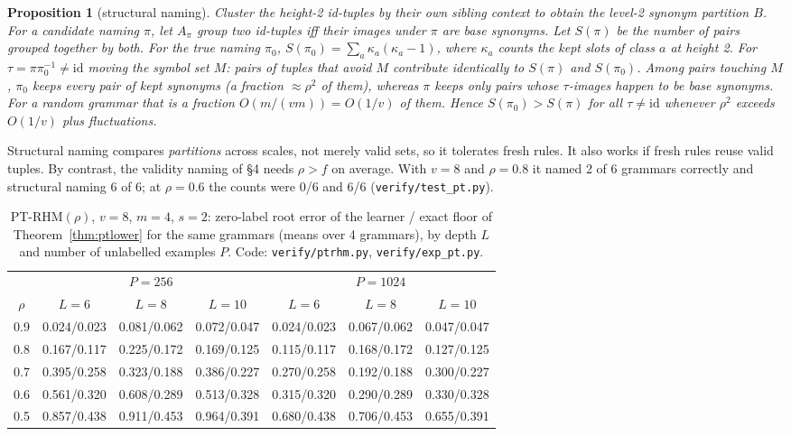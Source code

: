 \documentclass[11pt]{article}
\newtheorem{proposition}[theorem]{Proposition}
\theoremstyle{definition}
\begin{document}
\begin{proposition}[structural naming]\label{prop:snaming}
Cluster the height-2 id-tuples by their own sibling context to obtain the level-2 synonym
partition $B$. For a candidate naming $\pi$, let $A_\pi$ group two id-tuples iff their images
under $\pi$ are base synonyms. Let $S(\pi)$ be the number of pairs grouped together by both.
For the true naming $\pi_0$, $S(\pi_0)=\sum_a\kappa_a(\kappa_a-1)$, where $\kappa_a$ counts the
kept slots of class $a$ at height 2. For $\tau=\pi\pi_0^{-1}\ne\mathrm{id}$ moving the symbol
set $M$: pairs of tuples that avoid $M$ contribute identically to $S(\pi)$ and $S(\pi_0)$.
Among pairs touching $M$, $\pi_0$ keeps every pair of kept synonyms (a fraction $\approx\rho^2$
of them), whereas $\pi$ keeps only pairs whose $\tau$-images happen to be base synonyms. For
a random grammar that is a fraction $O(m/(vm))=O(1/v)$ of them. Hence
$S(\pi_0)>S(\pi)$ for all $\tau\ne\mathrm{id}$ whenever $\rho^2$ exceeds $O(1/v)$ plus
fluctuations.
\end{proposition}
\noindent Structural naming compares \emph{partitions} across scales, not merely valid sets, so
it tolerates fresh rules. It also works if fresh rules reuse valid tuples. By contrast, the
validity naming of \S4 needs $\rho>f$ on average. With $v=8$ and $\rho=0.8$ it named 2 of 6
grammars correctly and structural naming 6 of 6; at $\rho=0.6$ the counts were 0/6 and 6/6
(\texttt{verify/test\_pt.py}).

\begin{table}[h]\centering
\caption{PT-RHM$(\rho)$, $v{=}8$, $m{=}4$, $s{=}2$: zero-label root error of the learner
/ exact floor of Theorem~\ref{thm:ptlower} for the same grammars (means over 4 grammars), by
depth $L$ and number of unlabelled examples $P$. Code: \texttt{verify/ptrhm.py},
\texttt{verify/exp\_pt.py}.}\label{tab:pt}
\small\begin{tabular}{c|ccc|ccc}\toprule
& \multicolumn{3}{c|}{$P=256$} & \multicolumn{3}{c}{$P=1024$}\\
$\rho$ & $L=6$ & $L=8$ & $L=10$ & $L=6$ & $L=8$ & $L=10$\\ \midrule
0.9 & 0.024/0.023 & 0.081/0.062 & 0.072/0.047 & 0.024/0.023 & 0.067/0.062 & 0.047/0.047\\
0.8 & 0.167/0.117 & 0.225/0.172 & 0.169/0.125 & 0.115/0.117 & 0.168/0.172 & 0.127/0.125\\
0.7 & 0.395/0.258 & 0.323/0.188 & 0.386/0.227 & 0.270/0.258 & 0.192/0.188 & 0.300/0.227\\
0.6 & 0.561/0.320 & 0.608/0.289 & 0.513/0.328 & 0.315/0.320 & 0.290/0.289 & 0.330/0.328\\
0.5 & 0.857/0.438 & 0.911/0.453 & 0.964/0.391 & 0.680/0.438 & 0.706/0.453 & 0.655/0.391\\
\bottomrule\end{tabular}
\end{table}
\end{document}
